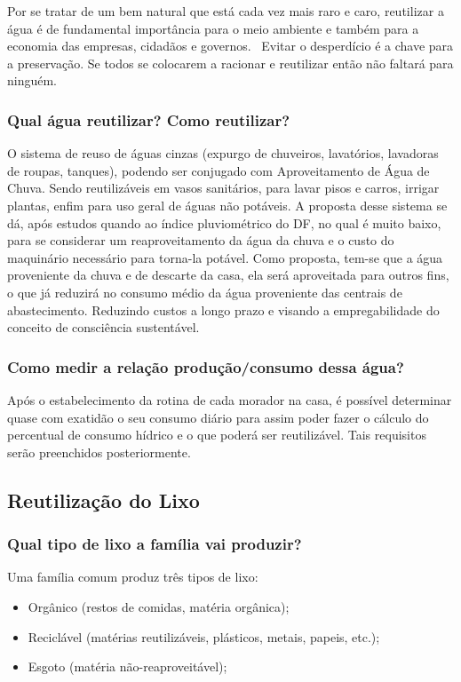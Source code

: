 	Por se tratar de um bem natural que está cada vez mais raro e caro, reutilizar a água é de fundamental importância para o meio ambiente e também para a economia das empresas, cidadãos e governos. 
Evitar o desperdício é a chave para a preservação. Se todos se colocarem a racionar e reutilizar então não faltará para ninguém.

\subsubsection{Qual água reutilizar? Como reutilizar?}

	O sistema de reuso de águas cinzas (expurgo de chuveiros, lavatórios, lavadoras de roupas, tanques), podendo ser conjugado com Aproveitamento de Água de Chuva. Sendo reutilizáveis em vasos sanitários, para lavar pisos e carros, irrigar plantas, enfim para uso geral de águas não potáveis. A proposta desse sistema se dá, após estudos quando ao índice pluviométrico do DF, no qual é muito baixo, para se considerar um reaproveitamento da água da chuva e o custo do maquinário necessário para torna-la potável. Como proposta, tem-se que a água proveniente da chuva e de descarte da casa, ela será aproveitada para outros fins, o que já reduzirá no consumo médio da água proveniente das centrais de abastecimento. Reduzindo custos a longo prazo e visando a empregabilidade do conceito de consciência sustentável.

\subsubsection{Como medir a relação produção/consumo dessa água?}

	Após o estabelecimento da rotina de cada morador na casa, é possível determinar quase com exatidão o seu consumo diário para assim poder fazer o cálculo do percentual de consumo hídrico e o que poderá ser reutilizável. Tais requisitos serão preenchidos posteriormente.

\subsection{Reutilização do Lixo}
\subsubsection{Qual tipo de lixo a família vai produzir?}

Uma família comum produz três tipos de lixo:
\begin{itemize}
	\item Orgânico (restos de comidas, matéria orgânica);
	\item Reciclável (matérias reutilizáveis, plásticos, metais, papeis, etc.);
	\item Esgoto (matéria não-reaproveitável);
\end{itemize}

